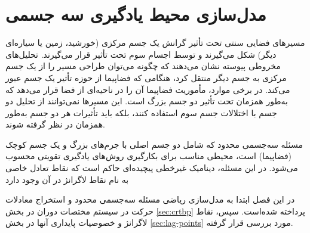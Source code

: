 %
%
%
%
%












\chapter{مدل‌سازی محیط یادگیری سه‌ جسمی}

مسیرهای فضایی سنتی تحت تأثیر گرانش یک جسم مرکزی (خورشید، زمین یا سیاره‌ای دیگر) شکل می‌گیرند و توسط اجسام سوم تحت تأثیر قرار می‌گیرند. تحلیل‌های مخروطی پیوسته نشان می‌دهند که چگونه می‌توان طراحی مسیر را از یک جسم مرکزی به جسم دیگر منتقل کرد، هنگامی که فضاپیما از حوزه تأثیر یک جسم عبور می‌کند. در برخی موارد، مأموریت فضاپیما آن را در ناحیه‌ای از فضا قرار می‌دهد که به‌طور همزمان تحت تأثیر دو جسم بزرگ است. این مسیرها نمی‌توانند از تحلیل دو جسم با اختلالات جسم سوم استفاده کنند، بلکه باید تأثیرات هر دو جسم به‌طور همزمان در نظر گرفته شوند.

مسئله سه‌جسمی محدود که شامل دو جسم اصلی با جرم‌های بزرگ و یک جسم کوچک (فضاپیما) است، محیطی مناسب برای بکارگیری روش‌های یادگیری تقویتی محسوب می‌شود. در این مسئله، دینامیک غیرخطی پیچیده‌ای حاکم است که نقاط تعادل خاصی به نام نقاط لاگرانژ در آن وجود دارد

در این فصل ابتدا به مدل‌سازی ریاضی مسئله سه‌جسمی محدود و استخراج معادلات حرکت در سیستم مختصات دوران 
در بخش \ref{sec:crtbp}
پرداخته شده‌است. سپس، نقاط لاگرانژ و خصوصیات پایداری آنها  در بخش
\ref{sec:lag-points}
 مورد بررسی قرار گرفته. 









